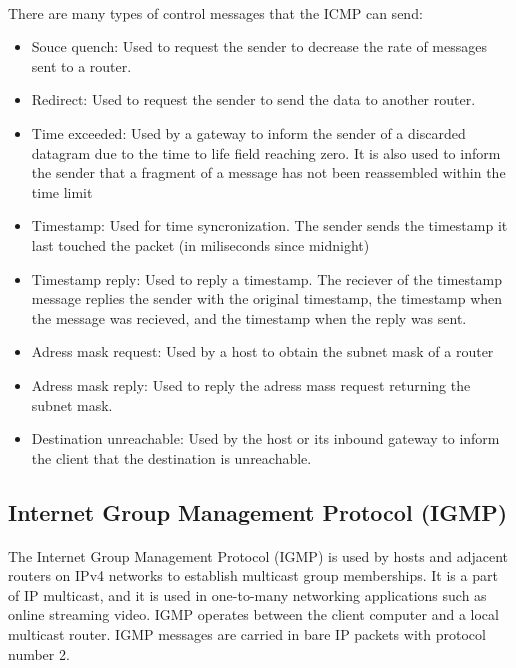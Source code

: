 \documentclass[12pt,a4paper]{report}
\begin{document}
\paragraph{}There are many types of control messages that the ICMP can send:
\begin{itemize}
	\item Souce quench: Used to request the sender to decrease the rate of messages sent to a router.
	\item Redirect: Used to request the sender to send the data to another router.
	\item Time exceeded: Used by a gateway to inform the sender of a discarded datagram due to the time to life field reaching zero. It is also used to inform the sender that a fragment of a message has not been reassembled within the time limit
	\item Timestamp: Used for time syncronization. The sender sends the timestamp it last touched the packet (in miliseconds since midnight)
	\item Timestamp reply: Used to reply a timestamp. The reciever of the timestamp message replies the sender with the original timestamp, the timestamp when the message was recieved, and the timestamp when the reply was sent.
	\item Adress mask request: Used by a host to obtain the subnet mask of a router
	\item Adress mask reply: Used to reply the adress mass request returning the subnet mask.
	\item Destination unreachable: Used by the host or its inbound gateway to inform the client that the destination is unreachable.
\end{itemize}

\subsection{Internet Group Management Protocol (IGMP)}
\paragraph{}The Internet Group Management Protocol (IGMP) is used by hosts and adjacent routers on IPv4 networks to establish multicast group memberships. It is a part of IP multicast, and it is used in one-to-many networking applications such as online streaming video. IGMP operates between the client computer and a local multicast router. IGMP messages are carried in bare IP packets with protocol number 2.
\end{document}
